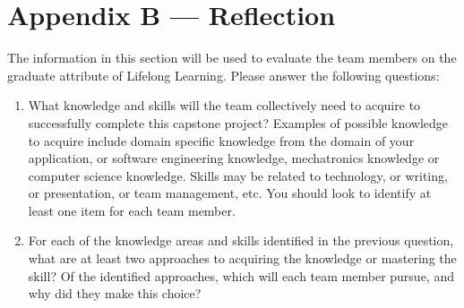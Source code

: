 \documentclass[12pt]{article}
\begin{document}
\newpage{}
\section*{Appendix B --- Reflection}

The information in this section will be used to evaluate the team members on the
graduate attribute of Lifelong Learning.  Please answer the following questions:

\begin{enumerate}
  \item What knowledge and skills will the team collectively need to acquire to
  successfully complete this capstone project?  Examples of possible knowledge
  to acquire include domain specific knowledge from the domain of your
  application, or software engineering knowledge, mechatronics knowledge or
  computer science knowledge.  Skills may be related to technology, or writing,
  or presentation, or team management, etc.  You should look to identify at
  least one item for each team member.
  \item For each of the knowledge areas and skills identified in the previous
  question, what are at least two approaches to acquiring the knowledge or
  mastering the skill?  Of the identified approaches, which will each team
  member pursue, and why did they make this choice?
\end{enumerate}
\end{document}
